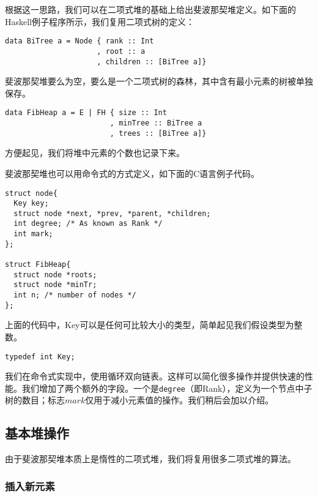 \documentclass[UTF8]{article}
\begin{document}
根据这一思路，我们可以在二项式堆的基础上给出斐波那契堆定义。如下面的Haskell例子程序所示，我们复用二项式树的定义：

\lstset{language=Haskell}
\begin{lstlisting}
data BiTree a = Node { rank :: Int
                     , root :: a
                     , children :: [BiTree a]}
\end{lstlisting}

斐波那契堆要么为空，要么是一个二项式树的森林，其中含有最小元素的树被单独保存。

\begin{lstlisting}
data FibHeap a = E | FH { size :: Int
                        , minTree :: BiTree a
                        , trees :: [BiTree a]}
\end{lstlisting}

方便起见，我们将堆中元素的个数也记录下来。

斐波那契堆也可以用命令式的方式定义，如下面的C语言例子代码。

\lstset{language=C}
\begin{lstlisting}
struct node{
  Key key;
  struct node *next, *prev, *parent, *children;
  int degree; /* As known as Rank */
  int mark;
};

struct FibHeap{
  struct node *roots;
  struct node *minTr;
  int n; /* number of nodes */
};
\end{lstlisting}

上面的代码中，Key可以是任何可比较大小的类型，简单起见我们假设类型为整数。

\lstset{language=C}
\begin{lstlisting}
typedef int Key;
\end{lstlisting}

我们在命令式实现中，使用循环双向链表\cite{CLRS}。这样可以简化很多操作并提供快速的性能。我们增加了两个额外的字段。一个是\texttt{degree}（即Rank），定义为一个节点中子树的数目；标志$mark$仅用于减小元素值的操作。我们稍后会加以介绍。


\subsection{基本堆操作}

由于斐波那契堆本质上是惰性的二项式堆，我们将复用很多二项式堆的算法。

\subsubsection{插入新元素}
\end{document}
